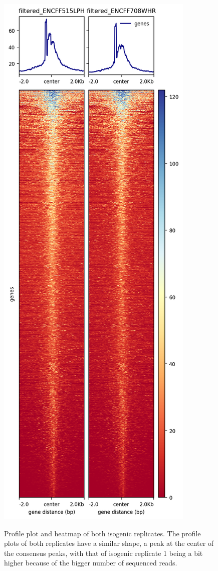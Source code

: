 \documentclass{article}
\begin{document}
\begin{figure}[h]
\caption{Profile plot and heatmap of both isogenic replicates. The profile plots of both replicates have a similar shape, a peak at the center of the consensus peaks, with that of isogenic replicate 1 being a bit higher because of the bigger number of sequenced reads.}
\centering
\includegraphics[height=\textheight]{heatmap.png}
\label{fig:heatmap}
\end{figure}
\end{document}
